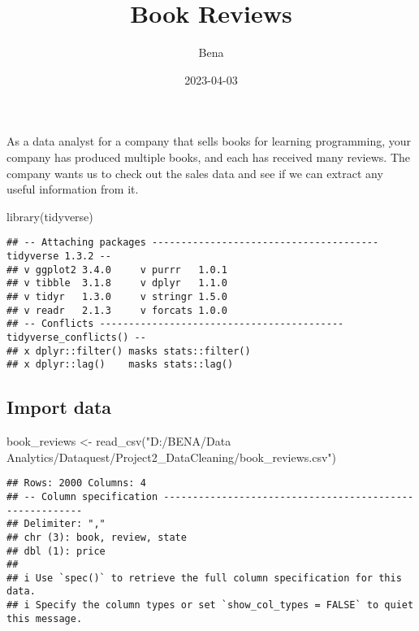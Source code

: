 \documentclass[
]{article}
\title{Book Reviews}
\author{Bena}
\date{2023-04-03}
\newenvironment{Shaded}{\begin{snugshade}}{\end{snugshade}}
\newcommand{\FunctionTok}[1]{\textcolor[rgb]{0.00,0.00,0.00}{#1}}
\newcommand{\NormalTok}[1]{#1}
\newcommand{\OtherTok}[1]{\textcolor[rgb]{0.56,0.35,0.01}{#1}}
\newcommand{\StringTok}[1]{\textcolor[rgb]{0.31,0.60,0.02}{#1}}
\begin{document}
\maketitle

As a data analyst for a company that sells books for learning
programming, your company has produced multiple books, and each has
received many reviews. The company wants us to check out the sales data
and see if we can extract any useful information from it.

\begin{Shaded}
\begin{Highlighting}[]
\FunctionTok{library}\NormalTok{(tidyverse)}
\end{Highlighting}
\end{Shaded}

\begin{verbatim}
## -- Attaching packages --------------------------------------- tidyverse 1.3.2 --
## v ggplot2 3.4.0     v purrr   1.0.1
## v tibble  3.1.8     v dplyr   1.1.0
## v tidyr   1.3.0     v stringr 1.5.0
## v readr   2.1.3     v forcats 1.0.0
## -- Conflicts ------------------------------------------ tidyverse_conflicts() --
## x dplyr::filter() masks stats::filter()
## x dplyr::lag()    masks stats::lag()
\end{verbatim}

\hypertarget{import-data}{%
\subsection{Import data}\label{import-data}}

\begin{Shaded}
\begin{Highlighting}[]
\NormalTok{book\_reviews }\OtherTok{\textless{}{-}} \FunctionTok{read\_csv}\NormalTok{(}\StringTok{"D:/BENA/Data Analytics/Dataquest/Project2\_DataCleaning/book\_reviews.csv"}\NormalTok{)}
\end{Highlighting}
\end{Shaded}

\begin{verbatim}
## Rows: 2000 Columns: 4
## -- Column specification --------------------------------------------------------
## Delimiter: ","
## chr (3): book, review, state
## dbl (1): price
## 
## i Use `spec()` to retrieve the full column specification for this data.
## i Specify the column types or set `show_col_types = FALSE` to quiet this message.
\end{verbatim}
\end{document}

